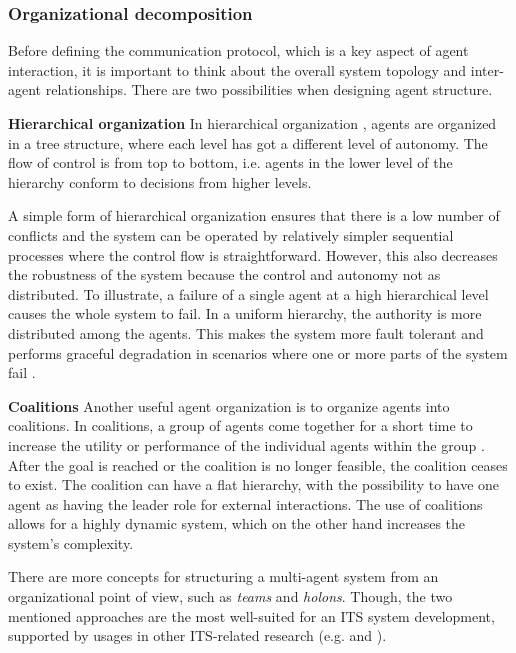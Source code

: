 \documentclass[0main.tex]{subfiles}
\begin{document}
\subsubsection{Organizational decomposition}\label{sec-conflicts}

Before defining the communication protocol, which is a key aspect of agent 
interaction, it is important to think about the overall system topology and inter-agent 
relationships. There are two possibilities when designing agent structure.

\textbf{Hierarchical organization}\newline
In hierarchical organization \cite{Damba2007}, agents are organized in a tree structure,
where each level has got a different level of autonomy. The flow of control is 
from top to bottom, i.e. agents in the lower level of the hierarchy conform to decisions 
from higher levels. 

A simple form of hierarchical organization ensures that there is a low number of conflicts and
the system can be operated by relatively simpler sequential processes where the control flow
is straightforward. However, this also decreases the robustness of the system because the
control and autonomy not as distributed. To illustrate, a failure of a single agent at a high
hierarchical level causes the whole system to fail. In a 
uniform hierarchy, the authority is more distributed among the agents. This makes the
system more fault tolerant and performs graceful degradation in scenarios where one or more
parts of the system fail \cite{ParasumannaGokulan2010}.

\textbf{Coalitions}\newline
Another useful agent organization is to organize agents into coalitions. In coalitions, a group of
agents come together for a short time to increase the utility or performance of the individual
agents within the group \cite{ParasumannaGokulan2010}. After the goal is reached or the coalition is no 
longer feasible, the coalition ceases to exist. The coalition can have a flat hierarchy, 
with the possibility to have one agent as having the leader role for external interactions. 
The use of coalitions allows for a highly dynamic system, which on the other hand increases the
system's complexity. 

There are more concepts for structuring a multi-agent system from an organizational point of view, 
such as \emph{teams} and \emph{holons}. Though, the two mentioned approaches are the most well-suited for 
an ITS system development, supported by usages in other ITS-related research (e.g.
\cite{Balaji2007} and \cite{Vijsel2004}). 
\end{document}
